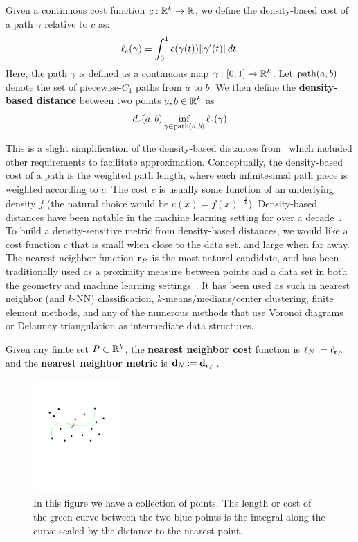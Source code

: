 \begin{definition}
Given a continuous cost function $c:\mathbb{R}^k \rightarrow \mathbb{R}$, we define the density-based
cost of a path $\gamma$ relative to $c$ as:
\[ \ell_c(\gamma) = \int_{0}^1 c(\gamma(t)) \| \gamma'(t) \|dt. \]
Here, the path $\gamma$ is defined as a continuous map $\gamma:[0,1]
\to \mathbb{R}^k$.
Let $\mathrm{path}(a,b)$ denote the set of piecewise-$C_1$ paths from $a$ to $b$.
We then define the \textbf{density-based distance} between two points $a, b \in
\mathbb{R}^k$ as
\[ d_c(a,b) \inf_{\gamma\in\mathrm{path}(a,b)} \ell_c(\gamma)\]
\end{definition}

This is a slight simplification of the density-based distances from~\cite{sajama05estimatingDBDM} which included other requirements to facilitate approximation.
Conceptually, the density-based cost of a path is the weighted path length,
where each infinitesimal path piece is weighted according to $c$.  The cost
$c$ is usually some function of an underlying density $f$ (the natural
choice would be $c(x) = f(x)^{-\frac{1}{k}}$).  Density-based distances
have been notable in the machine learning setting for over a
decade~\cite{sajama05estimatingDBDM,bijral11semiSupLearningDBD}.  To build
a density-sensitive metric from density-based distances, we would like a
cost function $c$ that is small when close to the data set, and large when
far away.  The nearest neighbor function $\mathbf{r}_P$ is the most natural
candidate, and has been traditionally used as a proximity measure between
points and a data set in both the geometry and machine learning
settings~\cite{bijral11semiSupLearningDBD}. It has been used as such in
nearest neighbor (and $k$-NN) classification, $k$-means/medians/center
clustering, finite element methods, and any of the numerous methods that
use Voronoi diagrams or Delaunay triangulation as intermediate data
structures.

\begin{definition} Given any finite set $P\subset \mathbb{R}^k$, the \textbf{nearest neighbor cost} function is $\ell_N := \ell_{\mathbf{r}_P}$ and the \textbf{nearest neighbor metric} is $\mathbf{d}_N := \mathbf{d}_{\mathbf{r}_P}$.
\end{definition}
\begin{figure}[htbp]
  \centering
    \includegraphics[width=0.3\textwidth]{Figures/example.pdf}
    \caption{In this figure we have a collection of points.
      The length or cost of the green curve between the two blue points
      is the integral along the curve scaled by the distance to the nearest
point.}
  \label{fig:example}
\end{figure}

